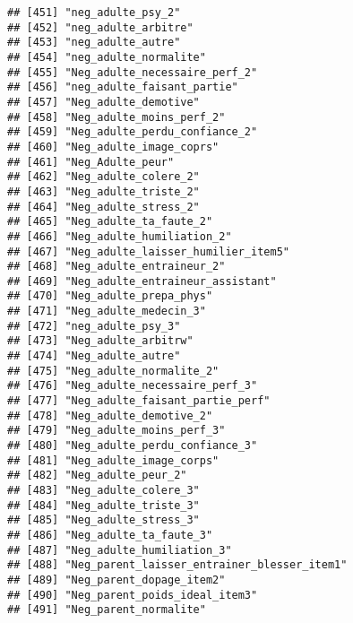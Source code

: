 \documentclass[
]{article}
\begin{document}
\begin{verbatim}
## [451] "neg_adulte_psy_2"                                    
## [452] "neg_adulte_arbitre"                                  
## [453] "neg_adulte_autre"                                    
## [454] "neg_adulte_normalite"                                
## [455] "Neg_adulte_necessaire_perf_2"                        
## [456] "neg_adulte_faisant_partie"                           
## [457] "Neg_adulte_demotive"                                 
## [458] "Neg_adulte_moins_perf_2"                             
## [459] "Neg_adulte_perdu_confiance_2"                        
## [460] "Neg_adulte_image_coprs"                              
## [461] "Neg_Adulte_peur"                                     
## [462] "Neg_adulte_colere_2"                                 
## [463] "Neg_adulte_triste_2"                                 
## [464] "Neg_adulte_stress_2"                                 
## [465] "Neg_adulte_ta_faute_2"                               
## [466] "Neg_adulte_humiliation_2"                            
## [467] "Neg_adulte_laisser_humilier_item5"                   
## [468] "Neg_adulte_entraineur_2"                             
## [469] "Neg_adulte_entraineur_assistant"                     
## [470] "Neg_adulte_prepa_phys"                               
## [471] "Neg_adulte_medecin_3"                                
## [472] "neg_adulte_psy_3"                                    
## [473] "Neg_adulte_arbitrw"                                  
## [474] "Neg_adulte_autre"                                    
## [475] "Neg_adulte_normalite_2"                              
## [476] "Neg_adulte_necessaire_perf_3"                        
## [477] "Neg_adulte_faisant_partie_perf"                      
## [478] "Neg_adulte_demotive_2"                               
## [479] "Neg_adulte_moins_perf_3"                             
## [480] "Neg_adulte_perdu_confiance_3"                        
## [481] "Neg_adulte_image_corps"                              
## [482] "Neg_adulte_peur_2"                                   
## [483] "Neg_adulte_colere_3"                                 
## [484] "Neg_adulte_triste_3"                                 
## [485] "Neg_adulte_stress_3"                                 
## [486] "Neg_adulte_ta_faute_3"                               
## [487] "Neg_adulte_humiliation_3"                            
## [488] "Neg_parent_laisser_entrainer_blesser_item1"          
## [489] "Neg_parent_dopage_item2"                             
## [490] "Neg_parent_poids_ideal_item3"                        
## [491] "Neg_parent_normalite"                                

\end{verbatim}
\end{document}
